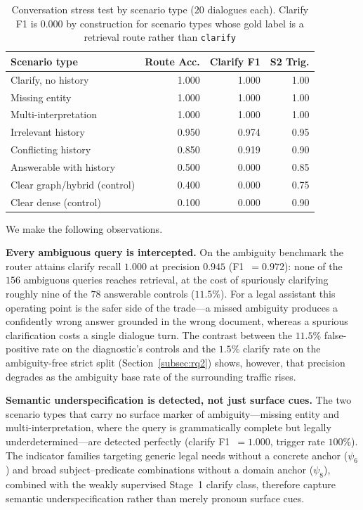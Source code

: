 \begin{table}[!htbp]
\centering
\caption{Conversation stress test by scenario type ($20$ dialogues each).
Clarify F1 is $0.000$ by construction for scenario types whose gold label is
a retrieval route rather than \texttt{clarify}}\label{tab:ambiguity_type}
\small
\begin{tabular}{lrrr}
\toprule
\textbf{Scenario type} & \textbf{Route Acc.} & \textbf{Clarify F1} & \textbf{S2 Trig.} \\
\midrule
Clarify, no history          & 1.000 & 1.000 & 1.00 \\
Missing entity               & 1.000 & 1.000 & 1.00 \\
Multi-interpretation         & 1.000 & 1.000 & 1.00 \\
Irrelevant history           & 0.950 & 0.974 & 0.95 \\
Conflicting history          & 0.850 & 0.919 & 0.90 \\
Answerable with history      & 0.500 & 0.000 & 0.85 \\
Clear graph/hybrid (control) & 0.400 & 0.000 & 0.75 \\
Clear dense (control)        & 0.100 & 0.000 & 0.90 \\
\bottomrule
\end{tabular}
\end{table}

We make the following observations.

\noindent\textbf{Every ambiguous query is intercepted.} On the ambiguity
benchmark the router attains clarify recall $1.000$ at precision $0.945$
(F1~$=0.972$): none of the $156$ ambiguous queries reaches retrieval, at the
cost of spuriously clarifying roughly nine of the $78$ answerable controls
($11.5\%$). For a legal assistant this operating point is the safer side of
the trade---a missed ambiguity produces a confidently wrong answer grounded
in the wrong document, whereas a spurious clarification costs a single
dialogue turn. The contrast between the $11.5\%$ false-positive rate on the
diagnostic's controls and the $1.5\%$ clarify rate on the ambiguity-free
strict split (Section~\ref{subsec:rq2}) shows, however, that precision
degrades as the ambiguity base rate of the surrounding traffic rises.

\noindent\textbf{Semantic underspecification is detected, not just surface
cues.} The two scenario types that carry no surface marker of
ambiguity---missing entity and multi-interpretation, where the query is
grammatically complete but legally underdetermined---are detected perfectly
(clarify F1~$=1.000$, trigger rate $100\%$). The indicator families targeting
generic legal needs without a concrete anchor ($\psi_6$) and broad
subject--predicate combinations without a domain anchor ($\psi_8$), combined
with the weakly supervised Stage~1 clarify class, therefore capture semantic
underspecification rather than merely pronoun surface cues.


